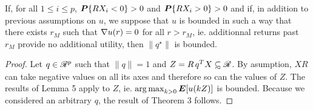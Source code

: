 \begin{thm}
  If, for all $1\leq i\leq p$, $\bm P\{RX_i<0\}>0$ and $\bm P\{RX_i>0\}>0$ and if, in addition
  to previous assumptions on $u$, we suppose that $u$ is bounded in such a way that there
  exists $r_M$ such that $\nabla u(r) = 0$ for all $r>r_M$, ie. additionnal returns past
  $r_M$ provide no additional utility, then $\|q^\star\|$ is bounded.
\end{thm}
\begin{proof}
  Let $q\in\mathscr{R}^p$ such that $\|q\|=1$ and $Z=R\,q^TX\subsetsim\real$. By asumption, $XR$
  can take negative values on all its axes and therefore so can the values of $Z$. The
  results of Lemma 5 apply to $Z$, ie. $\operatorname*{arg\,max}_{k>0} \bm E[u(kZ)]$ is bounded. Because we
  considered an arbitrary $q$, the result of Theorem 3 follows.
\end{proof}

